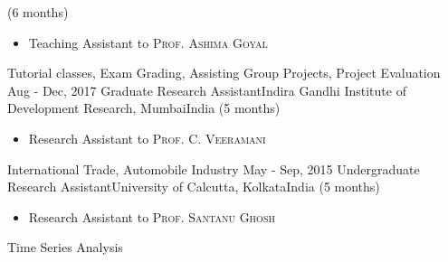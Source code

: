 \begin{experiences}
    {(6 months)} {
                      \begin{itemize}
                        \item Teaching Assistant to \textsc{Prof. Ashima Goyal}             
                      \end{itemize}
                    }
                    {Tutorial classes, Exam Grading, Assisting Group Projects, Project Evaluation}
\emptySeparator
  \texperience
    {Aug - Dec, 2017}   {Graduate Research Assistant}{Indira Gandhi Institute of Development Research, Mumbai}{India}
    {(5 months)} {
                      \begin{itemize}
                        \item Research Assistant to \textsc{Prof. C. Veeramani}             
                      \end{itemize}
                    }
                    {International Trade, Automobile Industry}
\emptySeparator
  \texperience
    {May - Sep, 2015}   {Undergraduate Research Assistant}{University of Calcutta, Kolkata}{India}
    {(5 months)} {
                      \begin{itemize}
                        \item Research Assistant to \textsc{Prof. Santanu Ghosh}             
                      \end{itemize}
                    }
                    {Time Series Analysis}
\end{experiences}